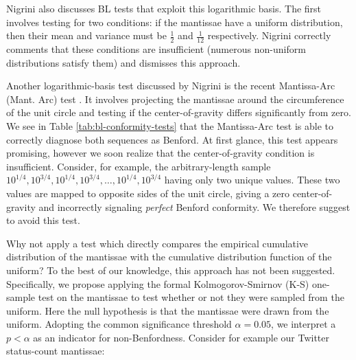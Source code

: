 \documentclass[twoside,leqno,twocolumn]{article}\usepackage[]{graphicx}\usepackage[]{color}
\begin{document}
Nigrini \cite{nigrini2012} also discusses BL tests that exploit this logarithmic basis. The first involves testing for two conditions: if the mantissae have a uniform distribution, then their mean and variance must be $\frac{1}{2}$ and $\frac{1}{12}$ respectively. Nigrini correctly comments that these conditions are insufficient (numerous non-uniform distributions satisfy them) and dismisses this approach. 


Another logarithmic-basis test discussed by Nigrini is the recent Mantissa-Arc (Mant. Arc) test \cite{alexander2009remarks}. It involves projecting the mantissae around the circumference of the unit circle and testing if the center-of-gravity differs significantly from zero. We see in Table \ref{tab:bl-conformity-tests} that the Mantissa-Arc test is able to correctly diagnose both sequences as Benford. At first glance, this test appears promising, however we soon realize that the center-of-gravity condition is insufficient. Consider, for example, the arbitrary-length sample $10^{1/4},10^{3/4},10^{1/4},10^{3/4},\ldots,10^{1/4},10^{3/4}$ having only two unique values. These two values are mapped to opposite sides of the unit circle, giving a zero center-of-gravity and incorrectly signaling \textit{perfect} Benford conformity. We therefore suggest to avoid this test.

Why not apply a test which directly compares the empirical cumulative distribution of the mantissae with the cumulative distribution function of the uniform? To the best of our knowledge, this approach has not been suggested. Specifically, we propose applying the formal Kolmogorov-Smirnov (K-S) one-sample test \cite{kolmogorov1933} on the mantissae to test whether or not they were sampled from the uniform. Here the null hypothesis is that the mantissae were drawn from the uniform. Adopting the common significance threshold $\alpha=0.05$, we interpret a $p<\alpha$ as an indicator for non-Benfordness. Consider for example our Twitter status-count mantissae:
\end{document}

